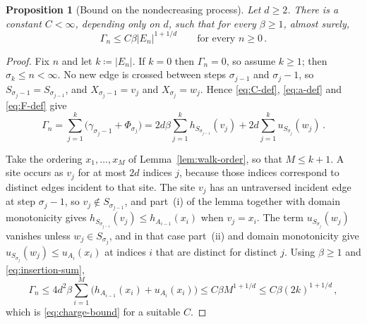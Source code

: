 \documentclass[11pt]{amsart}
\theoremstyle{plain}
\newtheorem{proposition}[theorem]{Proposition}
\theoremstyle{definition}
\begin{document}
	\begin{proposition}[Bound on the nondecreasing process]\label{prop:charge}
		Let $d\geq2$.  There is a constant $C<\infty$, depending only on $d$, such
		that for every $\beta\geq1$, almost surely,
		\begin{equation}\label{eq:charge-bound}
			\Gamma_n\leq C\beta|E_n|^{1+1/d}
			\qquad\text{for every }n\geq0\, .
		\end{equation}
	\end{proposition}

	\begin{proof}
		Fix $n$ and let $k\coloneqq|E_n|$.  If $k=0$ then $\Gamma_n=0$, so assume
		$k\geq1$; then $\sigma_k\leq n<\infty$.  No new edge is crossed between
		steps $\sigma_{j-1}$ and $\sigma_j-1$, so $S_{\sigma_j-1}=S_{\sigma_{j-1}}$,
		and $X_{\sigma_j-1}=v_j$ and $X_{\sigma_j}=w_j$.  Hence \eqref{eq:C-def},
		\eqref{eq:a-def} and \eqref{eq:F-def} give
		\[
			\Gamma_n=\sum_{j=1}^k\bigl(\gamma_{\sigma_j-1}+\Phi_{\sigma_j}\bigr)
			=2d\beta\sum_{j=1}^kh_{S_{\sigma_{j-1}}}(v_j)
			+2d\sum_{j=1}^ku_{S_{\sigma_j}}(w_j)\, .
		\]

		Take the ordering $x_1,\ldots,x_M$ of Lemma~\ref{lem:walk-order}, so that
		$M\leq k+1$.  A site occurs as $v_j$ for at most $2d$ indices $j$, because
		those indices correspond to distinct edges incident to that site.  The site $v_j$ has an
		untraversed incident edge at step $\sigma_j-1$, so
		$v_j\notin S_{\sigma_{j-1}}$, and part~(i) of the lemma together with domain
		monotonicity gives $h_{S_{\sigma_{j-1}}}(v_j)\leq h_{A_{i-1}}(x_i)$ when
		$v_j=x_i$.  The term $u_{S_{\sigma_j}}(w_j)$ vanishes unless
		$w_j\in S_{\sigma_j}$, and in that case part~(ii) and domain monotonicity
		give $u_{S_{\sigma_j}}(w_j)\leq u_{A_i}(x_i)$ at indices $i$ that are
		distinct for distinct $j$.  Using $\beta\geq1$ and \eqref{eq:insertion-sum},
		\[
			\Gamma_n\leq4d^2\beta\sum_{i=1}^M\bigl(h_{A_{i-1}}(x_i)+u_{A_i}(x_i)\bigr)
			\leq C\beta M^{1+1/d}\leq C\beta(2k)^{1+1/d}\, ,
		\]
		which is \eqref{eq:charge-bound} for a suitable $C$.
	\end{proof}
\end{document}
